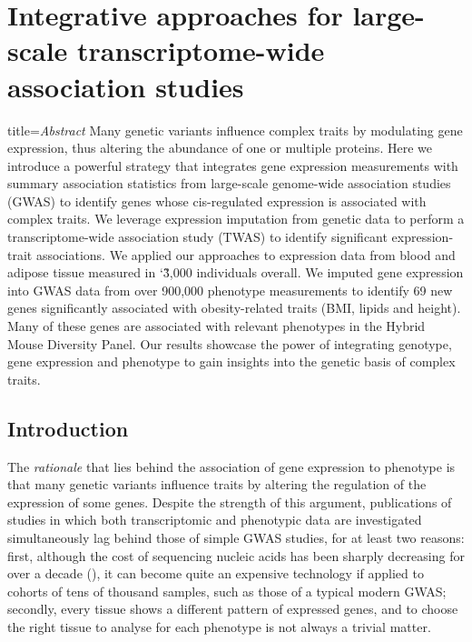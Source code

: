 \documentclass[../main.tex]{subfiles}
\begin{document}
\chapter{Integrative approaches for large-scale transcriptome-wide 
association studies}

\begin{external_abstract}{title=\textit{Abstract}}
Many genetic variants influence complex traits by modulating gene 
expression, thus altering the abundance of one or multiple proteins. 
Here we introduce a powerful strategy that integrates gene expression 
measurements with summary association statistics from large-scale 
genome-wide association studies (GWAS) to identify genes whose 
cis-regulated expression is associated with complex traits. We leverage 
expression imputation from genetic data to perform a transcriptome-wide 
association study (TWAS) to identify significant expression-trait 
associations. We applied our approaches to expression data from blood 
and adipose tissue measured in \char`\~3,000 individuals overall. We 
imputed gene expression into GWAS data from over 900,000 phenotype 
measurements to identify 69 new genes significantly associated with 
obesity-related traits (BMI, lipids and height). Many of these genes are 
associated with relevant phenotypes in the Hybrid Mouse Diversity Panel. 
Our results showcase the power of integrating genotype, gene expression 
and phenotype to gain insights into the genetic basis of complex traits.
\end{external_abstract}

\section{Introduction}

The \textit{rationale} that lies behind the association of gene 
expression to phenotype is that many genetic variants influence traits 
by altering the regulation of the expression of some genes. Despite the 
strength of this argument, publications of studies in which both 
transcriptomic and phenotypic data are investigated simultaneously lag 
behind those of simple GWAS studies, for at least two reasons: first, 
although the cost of sequencing nucleic acids has been sharply 
decreasing for over a decade (), it can become 
quite an expensive technology if applied to cohorts of tens of thousand 
samples, such as those of a typical modern GWAS; secondly, every tissue 
shows a different pattern of expressed genes, and to choose the right 
tissue to analyse for each phenotype is not always a trivial 
matter.
\end{document}
